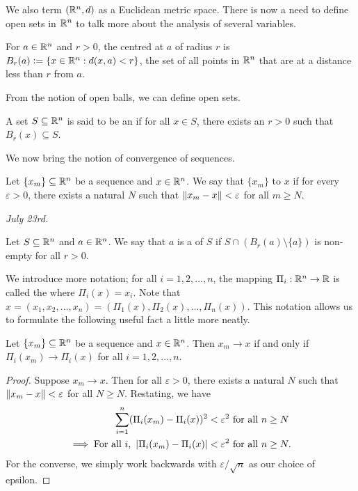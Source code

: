 We also term $(\mathbb{R}^{n},d)$ as a Euclidean metric space. There is now a need to define open sets in $\mathbb{R}^{n}$ to talk more about the analysis of several variables.
\begin{definition}
    For $a \in \mathbb{R}^{n}$ and $r > 0$, the  centred at $a$ of radius $r$ is $B_{r}(a) \vcentcolon= \{x \in \mathbb{R}^{n} : d(x,a) < r\}$, the set of all points in $\mathbb{R}^{n}$ that are at a distance less than $r$ from $a$.
\end{definition}
From the notion of open balls, we can define open sets.
\begin{definition}
    A set $S \subseteq \mathbb{R}^{n}$ is said to be an  if for all $x \in S$, there exists an $r > 0$ such that $B_{r}(x) \subseteq S$.
\end{definition}
We now bring the notion of convergence of sequences.
\begin{definition}
    Let $\{x_{m}\} \subseteq \mathbb{R}^{n}$ be a sequence and $x \in \mathbb{R}^{n}$. We say that $\{x_{m}\}$  to $x$ if for every $\varepsilon > 0$, there exists a natural $N$ such that $\left\lVert x_{m}-x\right\rVert < \varepsilon$ for all $m \geq N$.
\end{definition}

\textit{July 23rd.}

\begin{definition}
    Let $S \subseteq \mathbb{R}^{n}$ and $a \in \mathbb{R}^{n}$. We say that $a$ is a  of $S$ if $S \cap (B_{r}(a)\setminus\{a\})$ is non-empty for all $r > 0$.
\end{definition}

We introduce more notation; for all $i = 1,2,\ldots,n$, the mapping $\Pi_{i}:\mathbb{R}^{n} \to \mathbb{R}$ is called the  where $\Pi_{i}(x) = x_{i}$. Note that $x = (x_{1},x_{2},\ldots,x_{n}) = (\Pi_{1}(x),\Pi_{2}(x),\ldots,\Pi_{n}(x))$. This notation allows us to formulate the following useful fact a little more neatly.

\begin{theorem}
    Let $\{x_{m}\} \subseteq \mathbb{R}^{n}$ be a sequence and $x \in \mathbb{R}^{n}$. Then $x_{m} \to x$ if and only if $\Pi_{i}(x_{m}) \to \Pi_{i}(x)$ for all $i = 1,2,\ldots,n$.
\end{theorem}
\begin{proof}
    Suppose $x_{m} \to x$. Then for all $\varepsilon > 0$, there exists a natural $N$ such that $\left\lVert x_{m}-x\right\rVert < \varepsilon$ for all $N \geq N$. Restating, we have
    \begin{align}
        \sum_{i=1}^{n} (\Pi_{i}(x_{m})-\Pi_{i}(x))^{2} &< \varepsilon^{2} \text{ for all } n \geq N \\
        \implies \text{For all $i$, } \left| \Pi_{i}(x_{m})-\Pi_{i}(x) \right| &< \varepsilon^{2} \text{ for all } n \geq N.
    \end{align}
    For the converse, we simply work backwards with $\varepsilon/\sqrt{n}$ as our choice of epsilon.
\end{proof}

